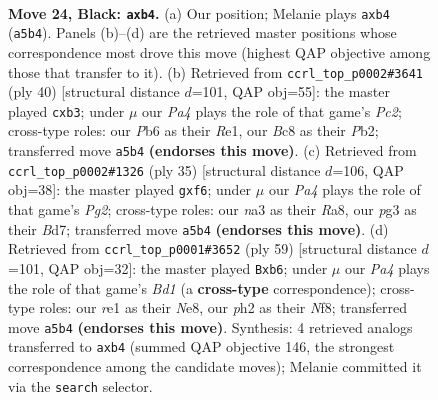 \documentclass[11pt]{article}
\begin{document}
\clearpage

\begin{figure}[p]\centering
\begin{subfigure}{0.46\textwidth}\centering
\resizebox{\linewidth}{!}{%
\newchessgame
\chessboard[
  setfen={2b2q2/5pkp/rp3np1/p7/PB6/NP4PN/5PBP/R3R1K1 b - - 0 24},
  showmover=false,
  pgfstyle=straightmove, color=movearrow, markmove={a5-b4}
]}
\caption{}
\end{subfigure}\hfill
\begin{subfigure}{0.46\textwidth}\centering
\resizebox{\linewidth}{!}{%
\newchessgame
\chessboard[
  setfen={2r2rk1/4ppbp/5np1/p3B3/Np6/Pb5P/1PPR1PP1/4R1K1 w - - 0 21},
  showmover=false,
  pgfstyle=straightmove, color=movearrow, markmove={c2-b3}
]}
\caption{}
\end{subfigure}
\\[4pt]
\begin{subfigure}{0.46\textwidth}\centering
\resizebox{\linewidth}{!}{%
\newchessgame
\chessboard[
  setfen={r5k1/3b1ppp/pb2pBn1/Np6/1P6/P3PN2/2r1BPPP/R2R2K1 b - - 0 18},
  showmover=false,
  pgfstyle=straightmove, color=movearrow, markmove={g7-f6}
]}
\caption{}
\end{subfigure}\hfill
\begin{subfigure}{0.46\textwidth}\centering
\resizebox{\linewidth}{!}{%
\newchessgame
\chessboard[
  setfen={2rbnnk1/5ppp/1B2p3/3p1P2/4N3/1P1BP2P/3R2P1/3R2K1 b - - 0 30},
  showmover=false,
  pgfstyle=straightmove, color=movearrow, markmove={d8-b6}
]}
\caption{}
\end{subfigure}
\caption{\textbf{Move 24, Black: \texttt{axb4}.} (a) Our position; Melanie plays \texttt{axb4} (\texttt{a5b4}). Panels (b)--(d) are the retrieved master positions whose correspondence most drove this move (highest QAP objective among those that transfer to it). (b) Retrieved from \texttt{ccrl\_top\_p0002\#3641} (ply 40) [structural distance $d$=101, QAP obj=55]: the master played \texttt{cxb3}; under $\mu$ our \emph{Pa4} plays the role of that game's \emph{Pc2}; cross-type roles: our \emph{P}b6 as their \emph{R}e1, our \emph{B}c8 as their \emph{P}b2; transferred move \texttt{a5b4} \textbf{(endorses this move)}. (c) Retrieved from \texttt{ccrl\_top\_p0002\#1326} (ply 35) [structural distance $d$=106, QAP obj=38]: the master played \texttt{gxf6}; under $\mu$ our \emph{Pa4} plays the role of that game's \emph{Pg2}; cross-type roles: our \emph{n}a3 as their \emph{R}a8, our \emph{p}g3 as their \emph{B}d7; transferred move \texttt{a5b4} \textbf{(endorses this move)}. (d) Retrieved from \texttt{ccrl\_top\_p0001\#3652} (ply 59) [structural distance $d$=101, QAP obj=32]: the master played \texttt{Bxb6}; under $\mu$ our \emph{Pa4} plays the role of that game's \emph{Bd1} (a \textbf{cross-type} correspondence); cross-type roles: our \emph{r}e1 as their \emph{N}e8, our \emph{p}h2 as their \emph{N}f8; transferred move \texttt{a5b4} \textbf{(endorses this move)}. Synthesis: 4 retrieved analogs transferred to \texttt{axb4} (summed QAP objective 146, the strongest correspondence among the candidate moves); Melanie committed it via the \texttt{search} selector.}
\label{fig:thought-m47}
\end{figure}
\end{document}
